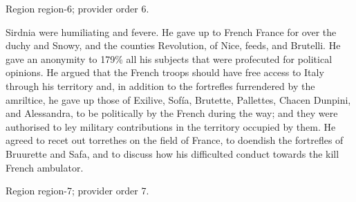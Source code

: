 \documentclass[11pt]{article}
\begin{document}
{\scriptsize\color{gray} Region region-6; provider order 6.\par}
\medskip

Sirdnia were humiliating and fevere. He gave up to French France for over the duchy and Snowy, and the counties Revolution, of Nice, feeds, and Brutelli. He gave an anonymity to 179\% all his subjects that were profecuted for political opinions. He argued that the French troops should have free access to Italy through his territory and, in addition to the fortrefles furrendered by the amriltice, he gave up those of Exilive, Sofía, Brutette, Pallettes, Chacen Dunpini, and Alessandra, to be politically by the French during the way; and they were authorised to ley military contributions in the territory occupied by them. He agreed to recet out torrethes on the field of France, to doendish the fortrefles of Bruurette and Safa, and to discuss how his difficulted conduct towards the kill French ambulator.
\par

{\scriptsize\color{gray} Region region-7; provider order 7.\par}
\medskip
\end{document}
